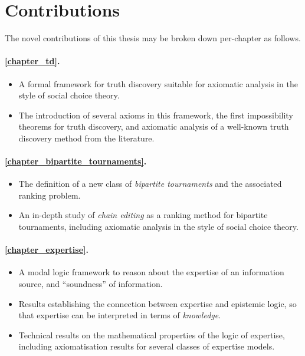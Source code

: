 
\section{Contributions}

The novel contributions of this thesis may be broken down per-chapter as
follows.

\paragraph{\cref{chapter_td}.}
\begin{itemize}
    \item A formal framework for truth discovery suitable for axiomatic
          analysis in the style of social choice theory.
    \item The introduction of several axioms in this framework, the first
          impossibility theorems for truth discovery, and axiomatic analysis of
          a well-known truth discovery method from the literature.
\end{itemize}

\paragraph{\cref{chapter_bipartite_tournaments}.}
\begin{itemize}
    \item The definition of a new class of \emph{bipartite tournaments} and the
          associated ranking problem.
    \item An in-depth study of \emph{chain editing} as a ranking method for
          bipartite tournaments, including axiomatic analysis in the style of
          social choice theory.
\end{itemize}

\paragraph{\cref{chapter_expertise}.}
\begin{itemize}
    \item A modal logic framework to reason about the expertise of an
          information source, and ``soundness'' of information.
    \item Results establishing the connection between expertise and
          epistemic logic, so that expertise can be interpreted in terms of
          \emph{knowledge}.
    \item Technical results on the mathematical properties of the logic of
          expertise, including axiomatisation results for several classes of
          expertise models.
\end{itemize}

